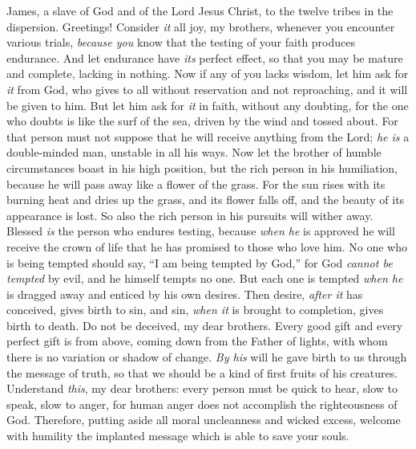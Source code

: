 
\begin{biblechapter} %
 James, a slave of God and of the Lord Jesus Christ, to the twelve tribes in the dispersion. Greetings!
 Consider \textit{it} all joy, my brothers, whenever you encounter various trials,
\verse \textit{because you} know that the testing of your faith produces endurance.
\verse And let endurance have \textit{its} perfect effect, so that you may be mature and complete, lacking in nothing.
\verse Now if any of you lacks wisdom, let him ask for \textit{it} from God, who gives to all without reservation and not reproaching, and it will be given to him.
\verse But let him ask for \textit{it} in faith, without any doubting, for the one who doubts is like the surf of the sea, driven by the wind and tossed about.
\verse For that person must not suppose that he will receive anything from the Lord;
\verse \textit{he is} a double-minded man, unstable in all his ways.
\verse Now let the brother of humble circumstances boast in his high position,
\verse but the rich person in his humiliation, because he will pass away like a flower of the grass.
\verse For the sun rises with its burning heat and dries up the grass, and its flower falls off, and the beauty of its appearance is lost. So also the rich person in his pursuits will wither away.
\verse Blessed \textit{is} the person who endures testing, because \textit{when he} is approved he will receive the crown of life that he has promised to those who love him.
\verse No one who is being tempted should say, “I am being tempted by God,” for God \textit{cannot be tempted} by evil, and he himself tempts no one.
\verse But each one is tempted \textit{when he} is dragged away and enticed by his own desires.
\verse Then desire, \textit{after it} has conceived, gives birth to sin, and sin, \textit{when it} is brought to completion, gives birth to death.
\verse Do not be deceived, my dear brothers.
\verse Every good gift and every perfect gift is from above, coming down from the Father of lights, with whom there is no variation or shadow of change.
\verse \textit{By his} will he gave birth to us through the message of truth, so that we should be a kind of first fruits of his creatures.
 Understand \textit{this}, my dear brothers: every person must be quick to hear, slow to speak, slow to anger,
\verse for human anger does not accomplish the righteousness of God.
\verse Therefore, putting aside all moral uncleanness and wicked excess, welcome with humility the implanted message which is able to save your souls.

\end{biblechapter}
